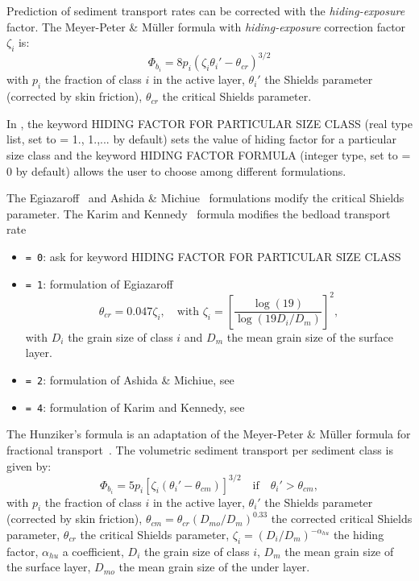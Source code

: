 Prediction of sediment transport rates can be corrected with the \emph{hiding-exposure} factor. The Meyer-Peter \& M\"uller formula with \emph{hiding-exposure} correction factor $\zeta_i$ is:
\begin{equation}\label{eq:MPMhiding}
\Phi_{b_i}  = 8 p_i \left(\zeta_i \theta_i' -\theta_{cr} \right)^{3/2} 
\end{equation}
with $p_i$ the fraction of class $i$ in the active layer, $\theta_i'$ the Shields parameter (corrected by skin friction), $\theta_{cr}$ the critical Shields parameter.

In \sisyphe{}, the keyword {\ttfamily HIDING FACTOR FOR PARTICULAR SIZE CLASS} (real type list, set to {\ttfamily = 1., 1.,...} by default) sets the value of hiding factor for a particular size class and the keyword {\ttfamily HIDING FACTOR FORMULA} (integer type, set to {\ttfamily = 0} by default) allows the user to choose among different formulations. 

The Egiazaroff~\cite{Egiazaroff} and Ashida \& Michiue~\cite{Ashida} formulations modify the critical Shields parameter. The Karim and Kennedy~\cite{Karim} formula modifies the bedload transport rate
\begin{itemize}
\item \texttt{= 0}: ask for keyword {\ttfamily HIDING FACTOR FOR PARTICULAR SIZE CLASS}
\item \texttt{= 1}: formulation of Egiazaroff 
  \begin{equation*}
 \theta_{cr} = 0.047\zeta_i,\quad\text{with}\,\, \zeta_i = \left[\frac{\log (19)}{\log (19 D_i /D_m)} \right]^2 ,
\end{equation*}
with $D_i$ the grain size of class $i$ and $D_m$ the mean grain size of the surface layer.
\item \texttt{= 2}: formulation of Ashida \& Michiue, see~\cite{Ashida}

\item \texttt{= 4}: formulation of Karim and Kennedy, see~\cite{Karim}

\end{itemize}

The Hunziker's formula is an adaptation of the Meyer-Peter \& M\"{u}ller formula for fractional transport~\cite{Hunziker}. The volumetric sediment transport per sediment class is given by:
\begin{equation}\label{eq:Hunziker}
\Phi_{b_i}  = 5 p_i \left[\zeta_i\left( \theta_i' -\theta_{cm} \right) \right]^{3/2} \quad\text{if}\quad \theta_i' > \theta_{cm}, 
\end{equation}
with $p_i$ the fraction of class $i$ in the active layer, $\theta_i'$ the Shields parameter (corrected by skin friction), 
$\theta_{cm} = \theta_{cr}\left(D_{mo}/D_m\right)^{0.33}$ the corrected critical Shields parameter, $\theta_{cr}$ the critical Shields parameter, $\zeta_{i} =\left(D_i/D_m\right)^{-\alpha_{hu}}$ the hiding factor, $\alpha_{hu}$ a coefficient, $D_i$ the grain size of class $i$, $D_m$ the mean grain size of the surface layer, $D_{mo}$ the mean grain size of the under layer.

